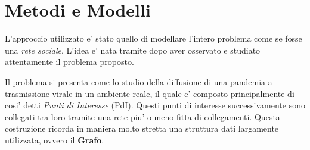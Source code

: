 \section{Metodi e Modelli}
L'approccio utilizzato e' stato quello di modellare l'intero problema come 
se fosse una \emph{rete sociale}. L'idea e' nata tramite dopo aver osservato e 
studiato attentamente il problema proposto. 

Il problema si presenta come lo studio della diffusione di una pandemia a trasmissione
virale in un ambiente reale, il quale e' composto principalmente di cosi' detti 
\emph{Punti di Interesse} (PdI). Questi punti di interesse successivamente sono 
collegati tra loro tramite una rete piu' o meno fitta di collegamenti. Questa costruzione
ricorda in maniera molto stretta una struttura dati largamente utilizzata, ovvero il \textbf{Grafo}.

